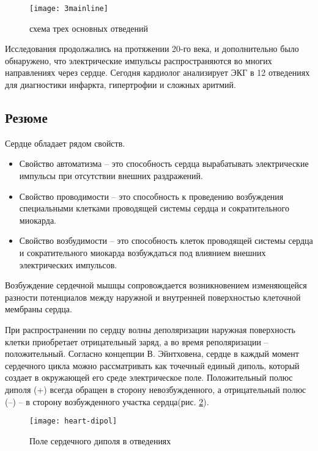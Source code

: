 \begin{figure}[h!]	
	\begin{center}
		\texttt{[image: 3mainline]}
		\caption{схема трех основных отведений}
		\label{ris:3mainline}
	\end{center}
\end{figure}

Исследования продолжались на протяжении 20-го века, и дополнительно было обнаружено, что электрические импульсы распространяются во многих направлениях через сердце. Сегодня кардиолог анализирует ЭКГ в 12 отведениях для диагностики инфаркта, гипертрофии и сложных аритмий.

\subsection{Резюме}

Сердце обладает рядом свойств.

\begin{itemize}
	\item Свойство автоматизма -- это способность сердца вырабатывать электрические импульсы при отсутствии внешних раздражений.
	\item Свойство проводимости -- это способность к проведению возбуждения специальными клетками проводящей системы сердца и сократительного миокарда.
	\item Свойство возбудимости -- это способность клеток проводящей системы сердца и сократительного миокарда возбуждаться под влиянием внешних электрических импульсов.
\end{itemize}

Возбуждение сердечной мышцы сопровождается возникновением изменяющейся разности потенциалов между наружной и внутренней поверхностью клеточной мембраны сердца.

При распространении по сердцу волны деполяризации наружная поверхность клетки приобретает отрицательный заряд, а во время реполяризации – положительный. Согласно концепции В. Эйнтховена, сердце в каждый момент сердечного цикла можно рассматривать как точечный единый диполь, который создает в окружающей его среде электрическое поле. Положительный полюс диполя (+) всегда обращен в сторону невозбужденного, а отрицательный полюс (–) -- в сторону возбужденного участка сердца(рис. \ref{ris:dipol}).

\begin{figure}[h!]
	\begin{center}
		\texttt{[image: heart-dipol]}
		\caption{Поле сердечного диполя в отведениях}
		\label{ris:dipol}
	\end{center}
\end{figure}


